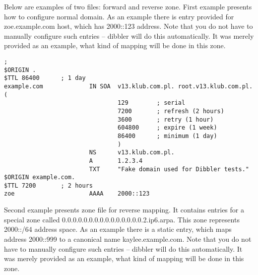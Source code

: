 Below are examples of two files: forward and reverse zone. First example
presents how to configure normal domain. As an example there is entry
provided for zoe.example.com host, which has 2000::123 address. Note
that you do not have to manually configure such entries -- dibbler will
do this automatically. It was merely provided as an example, what kind
of mapping will be done in this zone.

\begin{lstlisting}
;
$ORIGIN .
$TTL 86400      ; 1 day
example.com             IN SOA  v13.klub.com.pl. root.v13.klub.com.pl. (
                                129        ; serial
                                7200       ; refresh (2 hours)
                                3600       ; retry (1 hour)
                                604800     ; expire (1 week)
                                86400      ; minimum (1 day)
                                )
                        NS      v13.klub.com.pl.
                        A       1.2.3.4
                        TXT     "Fake domain used for Dibbler tests."
$ORIGIN example.com.
$TTL 7200       ; 2 hours
zoe                     AAAA    2000::123
\end{lstlisting}

Second example presents zone file for reverse mapping. It contains
entries for a special zone called
0.0.0.0.0.0.0.0.0.0.0.0.0.0.0.2.ip6.arpa. This zone represents 2000::/64
address space. As an example there is a static entry, which maps address
2000::999 to a canonical name kaylee.example.com. Note that you do not
have to manually configure such entries -- dibbler will do this
automatically. It was merely provided as an example, what kind
of mapping will be done in this zone.

